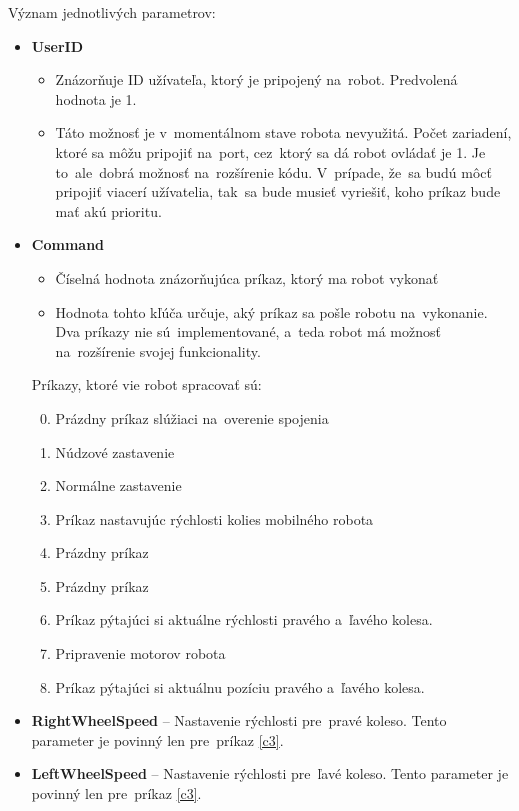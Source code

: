 	\noindent Význam jednotlivých parametrov:
	\begin{itemize}
		\item \textbf{UserID}
			\begin{itemize}
				\item Znázorňuje ID užívateľa, ktorý je pripojený na~robot. Predvolená hodnota je 1.
				\item Táto možnosť je v~momentálnom stave robota nevyužitá. Počet zariadení, ktoré sa môžu pripojiť na~port,
				cez~ktorý sa dá robot ovládať je 1. Je to~ale~dobrá možnosť na~rozšírenie kódu. V~prípade, že~sa budú môcť pripojiť
				viacerí užívatelia, tak~sa bude musieť vyriešiť, koho príkaz bude mať akú prioritu.
			\end{itemize}

		\item \textbf{Command}
			\begin{itemize}
				\item Číselná hodnota znázorňujúca príkaz, ktorý ma robot vykonať
				\item Hodnota tohto kľúča určuje, aký príkaz sa pošle robotu na~vykonanie. Dva príkazy nie sú~implementované,
				a~teda robot má možnosť na~rozšírenie svojej funkcionality.
			\end{itemize}

			Príkazy, ktoré vie robot spracovať sú:
			\begin{enumerate}
				\setcounter{enumi}{-1}
				\item \label{c0} Prázdny príkaz slúžiaci na~overenie spojenia
				\item \label{c1} Núdzové zastavenie
				\item \label{c2} Normálne zastavenie
				\item \label{c3} Príkaz nastavujúc rýchlosti kolies mobilného robota
				\item \label{c4} Prázdny príkaz
				\item \label{c5} Prázdny príkaz
				\item \label{c6} Príkaz pýtajúci si aktuálne rýchlosti pravého a~ľavého kolesa.
				\item \label{c7} Pripravenie motorov robota
				\item \label{c8}
					Príkaz pýtajúci si aktuálnu pozíciu pravého a~ľavého kolesa.
			\end{enumerate}
		\item \textbf{RightWheelSpeed} -- Nastavenie rýchlosti pre~pravé koleso. Tento parameter je povinný len
			pre~príkaz \ref{c3}.
		\item \textbf{LeftWheelSpeed} -- Nastavenie rýchlosti pre~ľavé koleso. Tento parameter je povinný len
			pre~príkaz \ref{c3}.
	\end{itemize}

